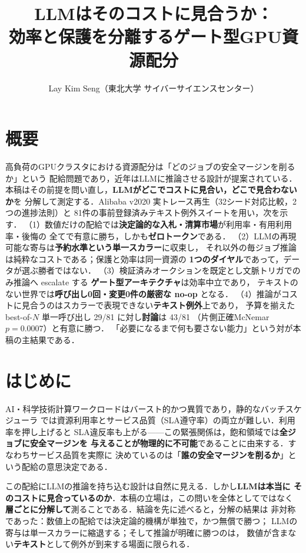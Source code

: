 \documentclass[uplatex,twocolumn,fontsize=9pt,paper=a4]{jlreq}
\title{LLMはそのコストに見合うか：\\効率と保護を分離するゲート型GPU資源配分}
\author{Lay Kim Seng（東北大学 サイバーサイエンスセンター）\\ \todo{共著者・指導教員を確認}}
\date{}
\begin{document}
\maketitle

\section*{概要}
高負荷のGPUクラスタにおける資源配分は「どのジョブの安全マージンを削るか」という
配給問題であり，近年はLLMに推論させる設計が提案されている．
本稿はその前提を問い直し，\textbf{LLMがどこでコストに見合い，どこで見合わないか}を
分解して測定する．Alibaba v2020 実トレース再生（32シード対応比較，2つの進捗法則）と
81件の事前登録済みテキスト例外スイートを用い，次を示す．
（1）数値だけの配給では\textbf{決定論的な入札・清算市場}が利用率・有用利用率・後悔の
全てで有意に勝ち，しかも\textbf{ゼロトークン}である．
（2）LLMの再現可能な寄与は\textbf{予約水準という単一スカラー}に収束し，
それ以外の毎ジョブ推論は純粋なコストである；保護と効率は同一資源の
\textbf{1つのダイヤル}であって，データが選ぶ勝者ではない．
（3）検証済みオークションを既定とし文脈トリガでのみ推論へ escalate する
\textbf{ゲート型アーキテクチャ}は効率中立であり，
テキストのない世界では\textbf{呼び出し0回・変更0件の厳密な no-op} となる．
（4）推論がコストに見合うのはスカラーで表現できない\textbf{テキスト例外}上であり，
予算を揃えた best-of-$N$ 単一呼び出し 29/81 に対し\textbf{討論}は 43/81
（片側正確McNemar $p=0.0007$）と有意に勝つ．
「必要になるまで何も要さない能力」という対が本稿の主結果である．

\section{はじめに}
AI・科学技術計算ワークロードはバースト的かつ異質であり，静的なバッチスケジューラ
では資源利用率とサービス品質（SLA遵守率）の両立が難しい．利用率を押し上げると
SLA違反率も上がる——この緊張関係は，飽和領域では\textbf{全ジョブに安全マージンを
与えることが物理的に不可能}であることに由来する．すなわちサービス品質を実際に
決めているのは「\textbf{誰の安全マージンを削るか}」という配給の意思決定である．

この配給にLLMの推論を持ち込む設計は自然に見える．しかし\textbf{LLMは本当に
そのコストに見合っているのか}．本稿の立場は，この問いを全体としてではなく
\textbf{層ごとに分解して}測ることである．結論を先に述べると，分解の結果は
非対称であった：数値上の配給では決定論的機構が単独で，かつ無償で勝つ；
LLMの寄与は単一スカラーに縮退する；そして推論が明確に勝つのは，
数値が含まない\textbf{テキスト}として例外が到来する場面に限られる．
\end{document}
